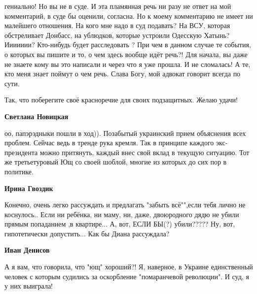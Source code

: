 \begin{itemize}
\begin{itemize}
гениально! Но вы не в суде. И эта пламянная речь ни разу не ответ на мой
комментарий, в суде бы оценили, согласна. Но к моему комментарию не имеет ни
малейшего отношения. На кого мне надо в суд подавать? На ВСУ, которая
обстреливает Донбасс, на ублюдков, которые устроили Одесскую Хатынь? Иииииии?
Кто-нибудь будет расследовать ? При чем в данном случае те события, о которых
вы пишите и то, о чем здесь вообще идёт речь?! Для начала, вы даже не знаете
кому вы это написали и через что я уже прошла. И не сломалась! А те, кто меня
знает поймут о чем речь. Слава Богу, мой адвокат говорит всегда по сути.

Так, что поберегите своё красноречие для своих подзащитных. Желаю удачи!

 
\textbf{Светлана Новицкая} 

оо, папэрэдныки пошли в ход)). Позабытый украинский прием объяснения всех
проблем. Сейчас ведь в тренде рука кремля. Так в принципе каждого
экс-президента можно притянуть, каждый внес свой вклад в текущую ситуацию. Тот
же третьетуровый Ющ со своей шоблой, многие из которых до сих пор в политике.


 
\textbf{Ирина Гвоздик} 

Конечно, очень легко рассуждать и предлагать "забыть
всё"",если тебя лично не коснулось.. Если ни ребёнка, ни маму, ни, даже, двоюродного
дядю не убили прямым попаданием ,в квартире... А, вот, ЕСЛИ БЫ(?)
убили????? Ну, вот, гипотетически допустить... Как бы Диана рассуждала?

 
\textbf{Иван Денисов} 

А я вам, что говорила, что "ющ" хороший?! Я, наверное, в
Украине единственный человек с которым судились за оскорбление "помаранчевой
революции". И суд, я у них выиграла!


\end{itemize}
\end{itemize}
